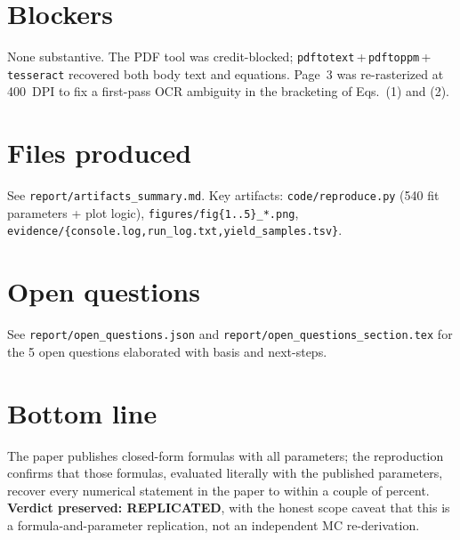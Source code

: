 \documentclass[11pt]{article}
\begin{document}
\section{Blockers}
None substantive. The PDF tool was credit-blocked; \texttt{pdftotext}\,+\,\texttt{pdftoppm}\,+\,\texttt{tesseract} recovered both body text and equations. Page~3 was re-rasterized at 400~DPI to fix a first-pass OCR ambiguity in the bracketing of Eqs.~(1) and (2).

\section{Files produced}
See \texttt{report/artifacts\_summary.md}. Key artifacts: \texttt{code/reproduce.py} (540 fit parameters + plot logic), \texttt{figures/fig\{1..5\}\_*.png}, \texttt{evidence/\{console.log,run\_log.txt,yield\_samples.tsv\}}.

\section{Open questions}
See \texttt{report/open\_questions.json} and \texttt{report/open\_questions\_section.tex} for the 5 open questions elaborated with basis and next-steps.

\section{Bottom line}
The paper publishes closed-form formulas with all parameters; the reproduction confirms that those formulas, evaluated literally with the published parameters, recover every numerical statement in the paper to within a couple of percent. \textbf{Verdict preserved: REPLICATED}, with the honest scope caveat that this is a formula-and-parameter replication, not an independent MC re-derivation.
\end{document}
